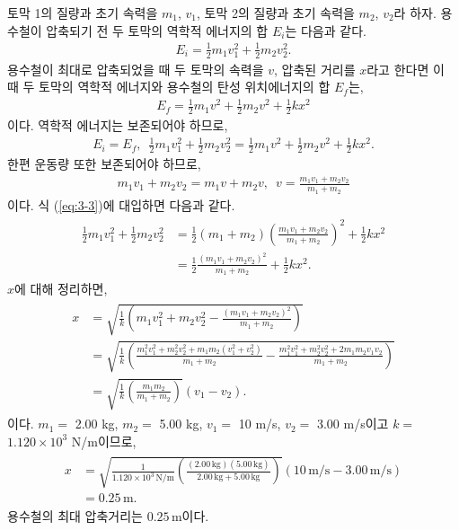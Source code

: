 \documentclass[floatfix,nofootinbib,superscriptaddress,fleqn]{revtex4-2}
\begin{document}
 토막 1의 질량과 초기 속력을 $m_1$, $v_1$,
토막 2의 질량과 초기 속력을 $m_2$, $v_2$라 하자. 용수철이 압축되기 전 
두 토막의 역학적 에너지의 합 $E_i$는 다음과 같다.
\begin{align}\label{eq:3-1}
  E_i = \frac{1}{2}m_1v_1^2+\frac{1}{2}m_2v_2^2.
\end{align}
용수철이 최대로 압축되었을 때 두 토막의 속력을 $v$, 압축된 거리를 $x$라고 
한다면 이 때 두 토막의 역학적 에너지와 용수철의 탄성 위치에너지의 합 $E_f$는,
\begin{align}\label{eq:3-2}
  E_f = \frac{1}{2}m_1v^2+\frac{1}{2}m_2v^2+\frac{1}{2}kx^2
\end{align}
이다. 역학적 에너지는 보존되어야 하므로,
\begin{align}\label{eq:3-3}
  E_i = E_f,\,\,\,\frac{1}{2}m_1v_1^2+\frac{1}{2}m_2v_2^2
  = \frac{1}{2}m_1v^2+\frac{1}{2}m_2v^2+\frac{1}{2}kx^2.
\end{align}
한편 운동량 또한 보존되어야 하므로,
\begin{align}\label{eq:3-4}
  m_1v_1+m_2v_2 = m_1v+m_2v,\,\,\,v=\frac{m_1v_1+m_2v_2}{m_1+m_2}
\end{align}
이다. 식 (\ref{eq:3-3})에 대입하면 다음과 같다.
\begin{align}
  \begin{split}
    \frac{1}{2}m_1v_1^2+\frac{1}{2}m_2v_2^2
    &= \frac{1}{2}(m_1+m_2){\left(\frac{m_1v_1+m_2v_2}{m_1+m_2}\right)}^2
    +\frac{1}{2}kx^2  \\
    &=\frac{1}{2}\frac{(m_1v_1+m_2v_2)^2}{m_1+m_2}
    +\frac{1}{2}kx^2.
  \end{split}
\end{align}
$x$에 대해 정리하면,
\begin{align}
  \begin{split}
    x &= \sqrt{\frac{1}{k}\left(
      m_1v_1^2+m_2v_2^2-\frac{(m_1v_1+m_2v_2)^2}{m_1+m_2}
      \right)}  \\
      &= \sqrt{\frac{1}{k}\left(
        \frac{m_1^2v_1^2+m_2^2v_2^2+m_1m_2(v_1^2+v_2^2)}{m_1+m_2}
        -\frac{m_1^2v_1^2+m_2^2v_2^2+2m_1m_2v_1v_2}{m_1+m_2}
        \right)}  \\
        &=\sqrt{\frac{1}{k}\left(
          \frac{m_1m_2}{m_1+m_2}
          \right)}(v_1-v_2).
      \end{split}
\end{align}
이다. $m_1=$ 2.00 kg, $m_2=$ 5.00 kg, $v_1=$ 10 m/s, $v_2=$ 3.00 m/s이고 
$k=$ $1.120\times 10^3$ N/m이므로,
\begin{align}
  \begin{split}
    x &= \sqrt{\frac{1}{1.120\times 10^3\,\mathrm{N/m}}\left(
      \frac{(2.00\,\mathrm{kg})(5.00\,\mathrm{kg})}
      {2.00\,\mathrm{kg}+5.00\,\mathrm{kg}}
      \right)}(10\,\mathrm{m/s}-3.00\,\mathrm{m/s}) \\
      &= 0.25\,\mathrm{m}.
  \end{split}
\end{align}
용수철의 최대 압축거리는 $0.25\,\mathrm{m}$이다.
\vspace{1cm}
\end{document}
